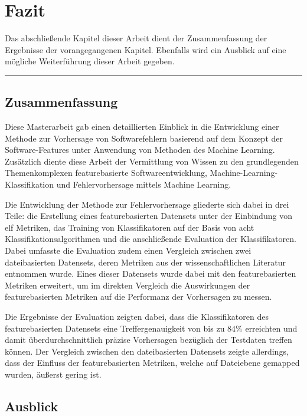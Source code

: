 
\chapter{Fazit}
\label{conclusion}

Das abschließende Kapitel dieser Arbeit dient der Zusammenfassung der Ergebnisse der vorangegangenen Kapitel. Ebenfalls wird ein Ausblick auf eine mögliche Weiterführung dieser Arbeit gegeben.
\\
\hrule

\section{Zusammenfassung}
Diese Masterarbeit gab einen detaillierten Einblick in die Entwicklung einer Methode zur Vorhersage von Softwarefehlern basierend auf dem Konzept der Software-Features unter Anwendung von Methoden des Machine Learning. Zusätzlich diente diese Arbeit der Vermittlung von Wissen zu den grundlegenden Themenkomplexen \glqq featurebasierte Softwareentwicklung\grqq{}, \glqq Machine-Learning-Klassifikation\grqq{} und \glqq Fehlervorhersage mittels Machine Learning\grqq.

Die Entwicklung der Methode zur Fehlervorhersage gliederte sich dabei in drei Teile: die Erstellung eines featurebasierten Datensets unter der Einbindung von elf Metriken, das Training von Klassifikatoren auf der Basis von acht Klassifikationsalgorithmen und die anschließende Evaluation der Klassifikatoren. Dabei umfasste die Evaluation zudem einen Vergleich zwischen zwei dateibasierten Datensets, deren Metriken aus der wissenschaftlichen Literatur entnommen wurde. Eines dieser Datensets wurde dabei mit den featurebasierten Metriken erweitert, um im direkten Vergleich die Auswirkungen der featurebasierten Metriken auf die Performanz der Vorhersagen zu messen.

Die Ergebnisse der Evaluation zeigten dabei, dass die Klassifikatoren des featurebasierten Datensets eine Treffergenauigkeit von bis zu $84\%$ erreichten und damit überdurchschnittlich präzise Vorhersagen bezüglich der Testdaten treffen können. Der Vergleich zwischen den dateibasierten Datensets zeigte allerdings, dass der Einfluss der featurebasierten Metriken, welche auf Dateiebene gemapped wurden, äußerst gering ist. 

\section{Ausblick}

